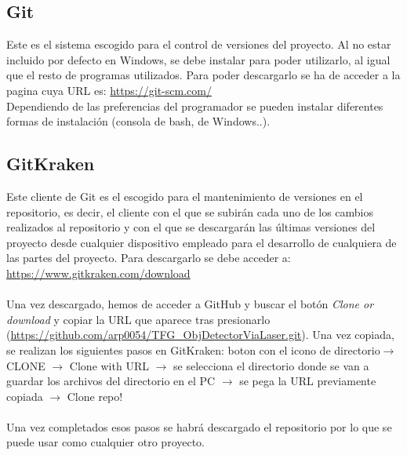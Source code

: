 \subsection{Git}
Este es el sistema escogido para el control de versiones del proyecto. Al no estar incluido por defecto en Windows, se debe instalar para poder utilizarlo, al igual que el resto de programas utilizados. Para poder descargarlo se ha de acceder a la pagina cuya URL es: \url{https://git-scm.com/}\\
Dependiendo de las preferencias del programador se pueden instalar diferentes formas de instalación (consola de bash, de Windows..).

\subsection{GitKraken}
Este cliente de Git es el escogido para el mantenimiento de versiones en el repositorio, es decir, el cliente con el que se subirán cada uno de los cambios realizados al repositorio y con el  que se descargarán las últimas versiones del proyecto desde cualquier dispositivo empleado para el desarrollo de cualquiera de las partes del proyecto. Para descargarlo se debe acceder a: \url{https://www.gitkraken.com/download}\\
\\
Una vez descargado, hemos de acceder a GitHub y buscar el botón \textit{Clone or download} y copiar la URL que aparece tras presionarlo (\url{https://github.com/arp0054/TFG_ObjDetectorViaLaser.git}). Una vez copiada, se realizan los siguientes pasos en GitKraken: boton con el icono de directorio$ \rightarrow$ CLONE $\rightarrow$ Clone with URL $\rightarrow$ se selecciona el directorio donde se van a guardar los archivos del directorio en el PC $\rightarrow$ se pega la URL previamente copiada $\rightarrow$ Clone repo!\\
\\
Una vez completados esos pasos se habrá descargado el repositorio por lo que se puede usar como cualquier otro proyecto.\\

